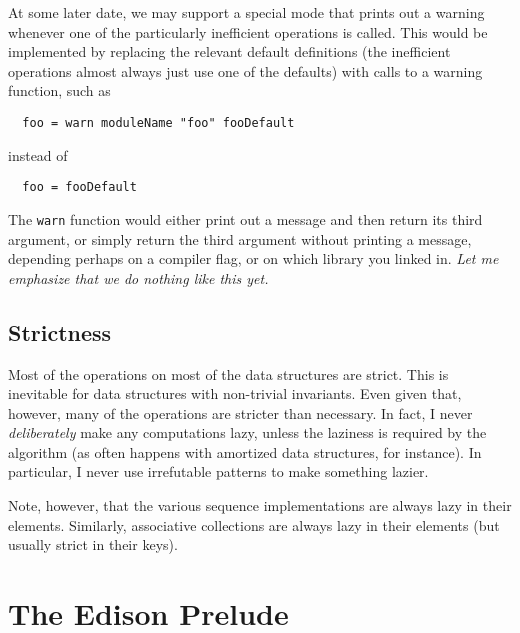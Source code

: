 \documentclass{report}
\newcommand{\cd}{\texttt}
\begin{document}
At some later date, we may support a special mode that prints out a
warning whenever one of the particularly inefficient operations is called.
This would be implemented by replacing the relevant default definitions
(the inefficient operations almost always just use one of the defaults)
with calls to a warning function, such as
\begin{verbatim}
  foo = warn moduleName "foo" fooDefault
\end{verbatim}
instead of
\begin{verbatim}
  foo = fooDefault
\end{verbatim}
The \cd{warn} function would either print out a message and then return
its third argument, or simply return the third argument without printing
a message, depending perhaps on a compiler flag, or on which library you
linked in.  \emph{Let me emphasize that we do nothing like this yet.}

\section{Strictness}

Most of the operations on most of the data structures are strict.  This is
inevitable for data structures with non-trivial invariants.  Even given that,
however, many of the operations are stricter than necessary.  In fact, I never
\emph{deliberately} make any computations lazy, unless the laziness is
required by the algorithm (as often happens with amortized data structures,
for instance).  In particular, I never use irrefutable patterns to make
something lazier.

Note, however, that the various sequence implementations are always
lazy in their elements.  Similarly, associative collections are
always lazy in their elements (but usually strict in their keys).


\chapter{The Edison Prelude}
\end{document}
